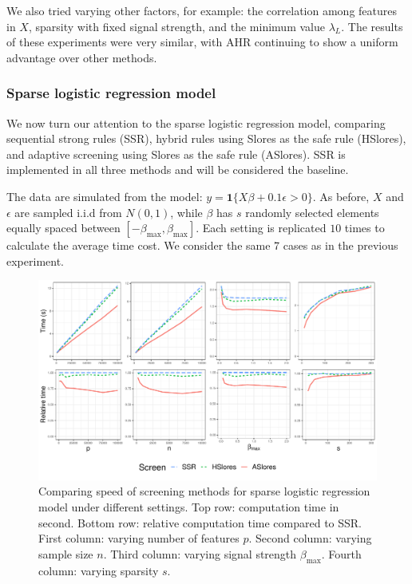 We also tried varying other factors, for example: the correlation among features in $X$, sparsity with fixed signal strength, and the minimum value $\lambda_L$. The results of these experiments were very similar, with AHR continuing to show a uniform advantage over other methods.

\subsubsection{Sparse logistic regression model}

We now turn our attention to the sparse logistic regression model, comparing sequential strong rules (SSR), hybrid rules using Slores as the safe rule (HSlores), and adaptive screening using Slores as the safe rule (ASlores). SSR is implemented in all three methods and will be considered the baseline.

The data are simulated from the model: $y=\mathbf{1}\{X\beta+0.1\epsilon >0\}$. As before, $X$ and $\epsilon$ are sampled i.i.d from $N(0,1)$, while $\beta$ has $s$ randomly selected elements equally spaced between $[-\beta_{\max},\beta_{\max}]$. Each setting is replicated $10$ times to calculate the average time cost. We consider the same 7 cases as in the previous experiment.

\begin{figure}[h]
    \centering
    \includegraphics[scale = 0.59]{plots/512.pdf}    \caption{Comparing speed of screening methods for sparse logistic regression model under different settings. Top row: computation time in second. Bottom row: relative computation time compared to SSR. First column: varying number of features $p$. Second column: varying sample size $n$. Third column: varying signal strength $\beta_{\max}$. Fourth column: varying sparsity $s$.}
    \label{fig:5.1.2a}
\end{figure}

